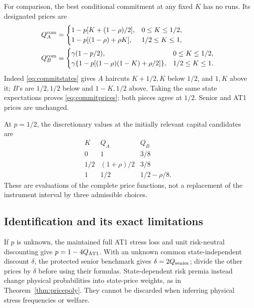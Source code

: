 \documentclass[11pt,a4paper]{article}
\numberwithin{equation}{section}
\theoremstyle{definition}
\begin{document}
For comparison, the best conditional commitment at any fixed \(K\)
has no runs. Its designated prices are
\begin{equation}\label{eq:commitprices}
\begin{aligned}
Q_A^{\rm com}&=
\begin{cases}
1-p[K+(1-\rho)/2],&0\le K\le1/2,\\
1-p[(1-\rho)+\rho K],&1/2\le K\le1,
\end{cases}\\
Q_B^{\rm com}&=
\begin{cases}
\gamma(1-p/2),&0\le K\le1/2,\\
\gamma\{1-p[(1-\rho)(1-K)+\rho/2]\},&1/2\le K\le1 .
\end{cases}
\end{aligned}
\end{equation}
Indeed \eqref{eq:commitstates} gives \(A\) haircuts
\(K+1/2,K\) below \(1/2\), and \(1,K\) above it; \(B\)'s are
\(1/2,1/2\) below and \(1-K,1/2\) above. Taking the same state
expectations proves \eqref{eq:commitprices}; both pieces agree at
\(1/2\). Senior and AT1 prices are unchanged.

At \(p=1/2\), the discretionary values at the initially relevant
capital candidates are
\[
\begin{array}{c|cc}
K&Q_A&Q_B\\ \hline
0&1&3/8\\
1/2&(1+\rho)/2&3/8\\
1&1/2&1/2-\rho/8 .
\end{array}
\]
These are evaluations of the complete price functions, not a replacement
of the instrument interval by three admissible choices.

\subsection{Identification and its exact limitations}
If \(p\) is unknown, the maintained full AT1 stress loss and unit
risk-neutral discounting give \(p=1-4Q_{\rm AT1}\).
With an unknown common state-independent discount \(\delta\), the
protected senior benchmark gives \(\delta=2Q_{\rm senior}\);
divide the other prices by \(\delta\) before using their formulas.
State-dependent risk premia instead change physical probabilities
into state-price weights, as in Theorem~\ref{thm:pricepoly}. They
cannot be discarded when inferring physical stress frequencies or welfare.
\end{document}
